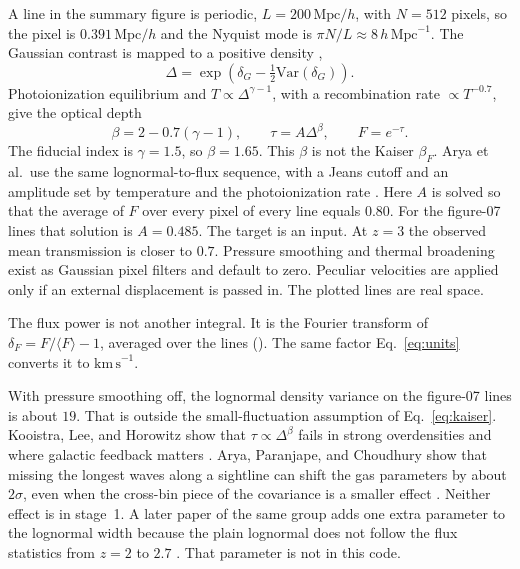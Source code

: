 \documentclass[11pt]{article}
\begin{document}
A line in the summary figure is periodic, $L=200\,\mathrm{Mpc}/h$, with $N=512$ pixels, so the pixel is $0.391\,\mathrm{Mpc}/h$ and the Nyquist mode is $\pi N/L\approx 8\,h\,\mathrm{Mpc}^{-1}$. The Gaussian contrast is mapped to a positive density \cite{Coles:1991if,Bi:1996fh},
\begin{equation}
\label{eq:lognormal}
\Delta=\exp\!\left(\delta_G-\tfrac12\mathrm{Var}(\delta_G)\right).
\end{equation}
Photoionization equilibrium and $T\propto\Delta^{\gamma-1}$, with a recombination rate $\propto T^{-0.7}$, give the optical depth \cite{Gunn:1965hd,Hui:1997dp,Kooistra:2022hzw}
\begin{equation}
\label{eq:fgpa}
\beta=2-0.7(\gamma-1),
\qquad
\tau=A\Delta^{\beta},
\qquad
F=e^{-\tau}.
\end{equation}
The fiducial index is $\gamma=1.5$, so $\beta=1.65$. This $\beta$ is not the Kaiser $\beta_F$. Arya et al.\ use the same lognormal-to-flux sequence, with a Jeans cutoff and an amplitude set by temperature and the photoionization rate \cite{Arya:2022uke}. Here $A$ is solved so that the average of $F$ over every pixel of every line equals $0.80$. For the figure-07 lines that solution is $A=0.485$. The target is an input. At $z=3$ the observed mean transmission is closer to $0.7$. Pressure smoothing and thermal broadening exist as Gaussian pixel filters and default to zero. Peculiar velocities are applied only if an external displacement is passed in. The plotted lines are real space.

The flux power is not another integral. It is the Fourier transform of $\delta_F=F/\langle F\rangle-1$, averaged over the lines (). The same factor Eq.~\eqref{eq:units} converts it to $\mathrm{km\,s}^{-1}$.

With pressure smoothing off, the lognormal density variance on the figure-07 lines is about $19$. That is outside the small-fluctuation assumption of Eq.~\eqref{eq:kaiser}. Kooistra, Lee, and Horowitz show that $\tau\propto\Delta^{\beta}$ fails in strong overdensities and where galactic feedback matters \cite{Kooistra:2022hzw}. Arya, Paranjape, and Choudhury show that missing the longest waves along a sightline can shift the gas parameters by about $2\sigma$, even when the cross-bin piece of the covariance is a smaller effect \cite{Arya:2023ipe}. Neither effect is in stage~1. A later paper of the same group adds one extra parameter to the lognormal width because the plain lognormal does not follow the flux statistics from $z=2$ to $2.7$ \cite{Arya:2023fal}. That parameter is not in this code.
\end{document}
